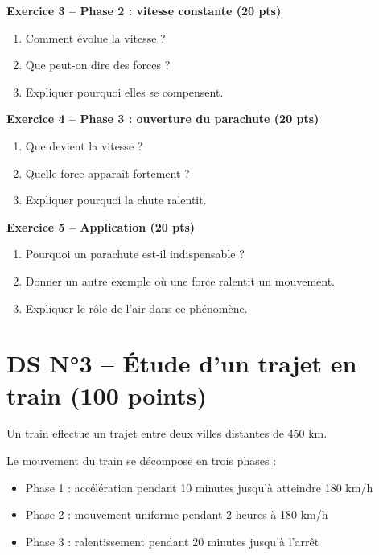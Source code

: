 \documentclass[11pt,a4paper]{article}
\begin{document}
\bigskip

\textbf{Exercice 3 – Phase 2 : vitesse constante (20 pts)}

\begin{enumerate}
\item Comment évolue la vitesse ?
\item Que peut-on dire des forces ?
\item Expliquer pourquoi elles se compensent.
\end{enumerate}

\bigskip

\textbf{Exercice 4 – Phase 3 : ouverture du parachute (20 pts)}

\begin{enumerate}
\item Que devient la vitesse ?
\item Quelle force apparaît fortement ?
\item Expliquer pourquoi la chute ralentit.
\end{enumerate}

\bigskip

\textbf{Exercice 5 – Application (20 pts)}

\begin{enumerate}
\item Pourquoi un parachute est-il indispensable ?
\item Donner un autre exemple où une force ralentit un mouvement.
\item Expliquer le rôle de l’air dans ce phénomène.



\end{enumerate}
\newpage
\section*{DS N°3 – Étude d’un trajet en train (100 points)}

Un train effectue un trajet entre deux villes distantes de 450 km.

Le mouvement du train se décompose en trois phases :
\begin{itemize}
\item Phase 1 : accélération pendant 10 minutes jusqu’à atteindre 180 km/h
\item Phase 2 : mouvement uniforme pendant 2 heures à 180 km/h
\item Phase 3 : ralentissement pendant 20 minutes jusqu’à l’arrêt
\end{itemize}
\end{document}
